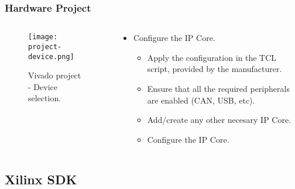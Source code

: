 \begin{frame}
	\frametitle{Hardware Project}
	\begin{columns}
		\begin{column}{0.4\textwidth}
			\begin{figure}
				\texttt{[image: project-device.png]}
				\caption{Vivado project - Device selection.}\label{fig:project-device}
			\end{figure}
		\end{column}
		\begin{column}{0.5\textwidth}
			\begin{itemize}
				\item Configure the IP Core.
				\begin{itemize}
					\item Apply the configuration in the TCL script, provided by the manufacturer.
					\item Ensure that all the required peripherals are enabled (CAN, USB, etc).
					\item Add/create any other necesary IP Core.
					\item Configure the IP Core.
				\end{itemize}
			\end{itemize}
		\end{column}
	\end{columns}
\end{frame}


% 

\subsection{Xilinx SDK}
